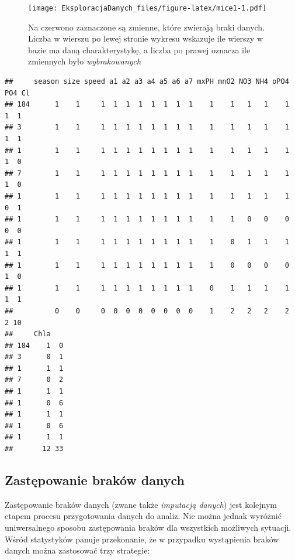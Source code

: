 \documentclass[]{book}
\theoremstyle{plain}
\theoremstyle{definition}
\begin{document}
\begin{figure}
\centering
\texttt{[image: EksploracjaDanych\_files/figure-latex/mice1-1.pdf]}
\caption{\label{fig:mice1}Na czerwono zaznaczone są zmienne, które zwierają braki danych. Liczba w wierszu po lewej stronie wykresu wskazuje ile wierszy w bazie ma daną charakterystykę, a liczba po prawej oznacza ile zmiennych było \emph{wybrakowanych}}
\end{figure}

\begin{verbatim}
##     season size speed a1 a2 a3 a4 a5 a6 a7 mxPH mnO2 NO3 NH4 oPO4 PO4 Cl
## 184      1    1     1  1  1  1  1  1  1  1    1    1   1   1    1   1  1
## 3        1    1     1  1  1  1  1  1  1  1    1    1   1   1    1   1  1
## 1        1    1     1  1  1  1  1  1  1  1    1    1   1   1    1   1  0
## 7        1    1     1  1  1  1  1  1  1  1    1    1   1   1    1   1  0
## 1        1    1     1  1  1  1  1  1  1  1    1    1   1   1    1   0  1
## 1        1    1     1  1  1  1  1  1  1  1    1    1   0   0    0   0  0
## 1        1    1     1  1  1  1  1  1  1  1    1    0   1   1    1   1  1
## 1        1    1     1  1  1  1  1  1  1  1    1    0   0   0    0   1  0
## 1        1    1     1  1  1  1  1  1  1  1    0    1   1   1    1   1  1
##          0    0     0  0  0  0  0  0  0  0    1    2   2   2    2   2 10
##     Chla   
## 184    1  0
## 3      0  1
## 1      1  1
## 7      0  2
## 1      1  1
## 1      0  6
## 1      1  1
## 1      0  6
## 1      1  1
##       12 33
\end{verbatim}

\hypertarget{zastepowanie-brakow-danych}{%
\subsection{Zastępowanie braków danych}\label{zastepowanie-brakow-danych}}

Zastępowanie braków danych (zwane także \emph{imputacją danych}) jest kolejnym etapem procesu przygotowania danych do analiz. Nie można jednak wyróżnić uniwersalnego sposobu zastępowania braków dla wszystkich możliwych sytuacji. Wśród statystyków panuje przekonanie, że w przypadku wystąpienia braków danych można zastosować trzy strategie:
\end{document}
